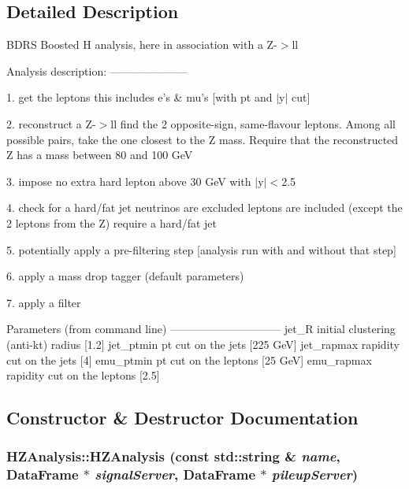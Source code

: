 \subsection{Detailed Description}
BDRS Boosted H analysis, here in association with a Z-$>$ll

Analysis description: ---------------------

1. get the leptons this includes e's \& mu's \mbox{[}with pt and $|$y$|$ cut\mbox{]}

2. reconstruct a Z-$>$ll find the 2 opposite-sign, same-flavour leptons. Among all possible pairs, take the one closest to the Z mass. Require that the reconstructed Z has a mass between 80 and 100 Ge\-V

3. impose no extra hard lepton above 30 Ge\-V with $|$y$|$$<$2.5

4. check for a hard/fat jet neutrinos are excluded leptons are included (except the 2 leptons from the Z) require a hard/fat jet

5. potentially apply a pre-filtering step \mbox{[}analysis run with and without that step\mbox{]}

6. apply a mass drop tagger (default parameters)

7. apply a filter

Parameters (from command line) ------------------------------ jet\_\-R initial clustering (anti-kt) radius \mbox{[}1.2\mbox{]} jet\_\-ptmin pt cut on the jets \mbox{[}225 Ge\-V\mbox{]} jet\_\-rapmax rapidity cut on the jets \mbox{[}4\mbox{]} emu\_\-ptmin pt cut on the leptons \mbox{[}25 Ge\-V\mbox{]} emu\_\-rapmax rapidity cut on the leptons \mbox{[}2.5\mbox{]} 



\subsection{Constructor \& Destructor Documentation}
\hypertarget{classHZAnalysis_9660d265c62a0c30f6cfdbf6ac8abcf3}{
\subsubsection[HZAnalysis]{\setlength{\rightskip}{0pt plus 5cm}HZAnalysis::HZAnalysis (const std::string \& {\em name}, Data\-Frame $\ast$ {\em signal\-Server}, Data\-Frame $\ast$ {\em pileup\-Server})}}
\label{classHZAnalysis_9660d265c62a0c30f6cfdbf6ac8abcf3}


